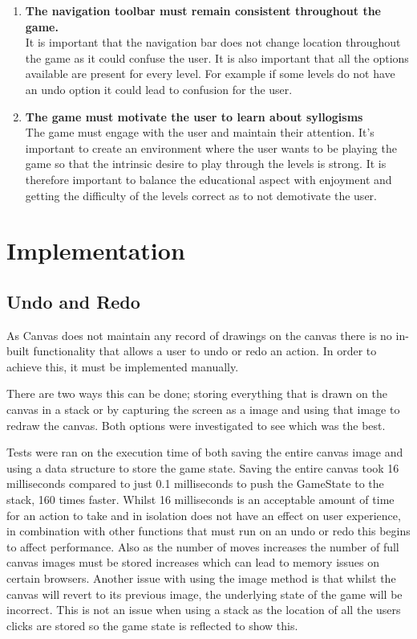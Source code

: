 \documentclass[12pt,a4paper]{report}
\begin{document}
\begin{enumerate}[label*=\arabic*]
                                      \item \textbf{The navigation toolbar must remain consistent throughout the game.
                                      }\\
It is important that the navigation bar does not change location throughout the game as it could confuse the user. It is also important that all the options available are present for every level. For example if some levels do not have an undo option it could lead to confusion for the user.

                                      \item \textbf{The game must motivate the user to learn about syllogisms
}\\
The game must engage with the user and maintain their attention. It's important to create an environment where the user wants to be playing the game so that the intrinsic desire to play through the levels is strong. It is therefore important to balance the educational aspect with enjoyment and getting the difficulty of the levels correct as to not demotivate the user.
            \end{enumerate}

\chapter{Implementation}

\section{Undo and Redo}
As Canvas does not maintain any record of drawings on the canvas there is no in-built functionality that allows a user to undo or redo an action. In order to achieve this, it must be implemented manually.

There are two ways this can be done; storing everything that is drawn on the canvas in a stack or by capturing the screen as a image and using that image to redraw the canvas. Both options were investigated to see which was the best.

Tests were ran on the execution time of both saving the entire canvas image and using a data structure to store the game state. Saving the entire canvas took 16 milliseconds compared to just 0.1 milliseconds to push the GameState to the stack, 160 times faster. Whilst 16 milliseconds is an acceptable amount of time for an action to take and in isolation does not have an effect on user experience, in combination with other functions that must run on an undo or redo this begins to affect performance. Also as the number of moves increases the number of full canvas images must be stored increases which can lead to memory issues on certain browsers. Another issue with using the image method is that whilst the canvas will revert to its previous image, the underlying state of the game will be incorrect. This is not an issue when using a stack as the location of all the users clicks are stored so the game state is reflected to show this.
\end{document}
